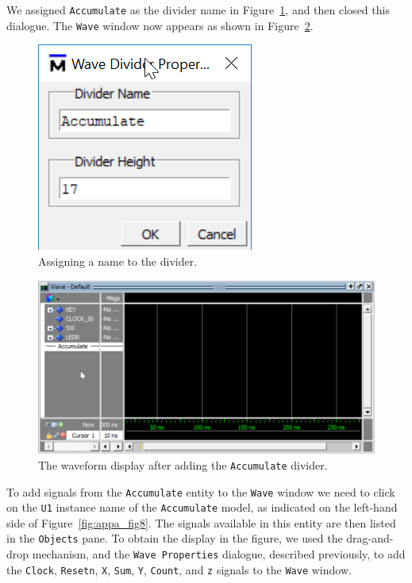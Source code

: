 \documentclass[11pt, twoside, pdftex]{article}
\begin{document}
\noindent
We assigned \texttt{Accumulate} as the divider name in Figure~\ref{fig:appa_fig6},
and then closed this dialogue. The \texttt{Wave} window now appears as shown in 
Figure~\ref{fig:appa_fig7}.

\begin{figure}[h!]
	\begin{center}
		\includegraphics[scale=0.8]{figures/appa_fig6.png}
	\end{center}
		  \caption{Assigning a name to the divider.}
	\label{fig:appa_fig6}
\end{figure}

\begin{figure}[h!]
	\begin{center}
		\includegraphics[width = \textwidth]{figures/appa_fig7.png}
	\end{center}
	\caption{The waveform display after adding the \texttt{Accumulate} divider.}
	\vspace{-0.25 cm}
	\label{fig:appa_fig7}
\end{figure}

\noindent
To add signals from the \texttt{Accumulate} entity to the \texttt{Wave} window we need to
click on the \texttt{U1} instance name of the \texttt{Accumulate} model, as indicated  
on the left-hand side of Figure~\ref{fig:appa_fig8}. The signals available in this entity
are then listed in the \texttt{Objects} pane. To obtain the display in the figure, we
used the drag-and-drop mechanism, and the \texttt{Wave Properties} dialogue, described 
previously, to add the \texttt{Clock}, \texttt{Resetn}, \texttt{X}, \texttt{Sum},
\texttt{Y}, \texttt{Count}, and \texttt{z} signals to the \texttt{Wave} window.
\end{document}
